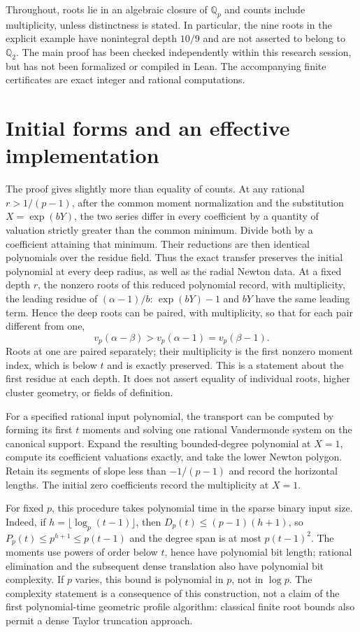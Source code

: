 Throughout, roots lie in an algebraic closure of $\mathbb Q_p$ and counts
include multiplicity, unless distinctness is stated. In particular, the
nine roots in the explicit example have nonintegral depth $10/9$ and are
not asserted to belong to $\mathbb Q_2$. The main proof has been checked
independently within this research session, but has not been formalized
or compiled in Lean. The accompanying finite certificates are exact
integer and rational computations.



\section{Initial forms and an effective implementation}
The proof gives slightly more than equality of counts. At any rational
$r>1/(p-1)$, after the common moment normalization and the substitution
$X=\exp(bY)$, the two series differ in every coefficient by a quantity of
valuation strictly greater than the common minimum. Divide both by a
coefficient attaining that minimum. Their reductions are then identical
polynomials over the residue field. Thus the exact transfer preserves
the initial polynomial at every deep radius, as well as the radial Newton
data. At a fixed depth $r$, the nonzero roots of this reduced polynomial
record, with multiplicity, the leading residue of $(\alpha-1)/b$:
$\exp(bY)-1$ and $bY$ have the same leading term. Hence the deep roots
can be paired, with multiplicity, so that for each pair different from one,
\[
 v_p(\alpha-\beta)>v_p(\alpha-1)=v_p(\beta-1).
\]
Roots at one are paired separately; their multiplicity is the first
nonzero moment index, which is below $t$ and is exactly preserved.
This is a statement about the first residue at each depth. It does not
assert equality of individual roots, higher cluster geometry, or fields
of definition.

For a specified rational input polynomial, the transport can be computed
by forming its first $t$ moments and solving one rational Vandermonde
system on the canonical support. Expand the resulting bounded-degree
polynomial at $X=1$, compute its coefficient valuations exactly, and take
the lower Newton polygon. Retain its segments of slope less than
$-1/(p-1)$ and record the horizontal lengths. The initial zero coefficients
record the multiplicity at $X=1$.

For fixed $p$, this procedure takes polynomial time in the sparse binary
input size. Indeed, if $h=\lfloor\log_p(t-1)\rfloor$, then
$D_p(t)\le(p-1)(h+1)$, so
$P_p(t)\le p^{h+1}\le p(t-1)$ and the degree span is at most
$p(t-1)^2$. The moments use powers of order below $t$, hence have
polynomial bit length; rational elimination and the subsequent dense
translation also have polynomial bit complexity. If $p$ varies, this
bound is polynomial in $p$, not in $\log p$. The complexity statement
is a consequence of this construction, not a claim of the first
polynomial-time geometric profile algorithm: classical finite root
bounds also permit a dense Taylor truncation approach.

